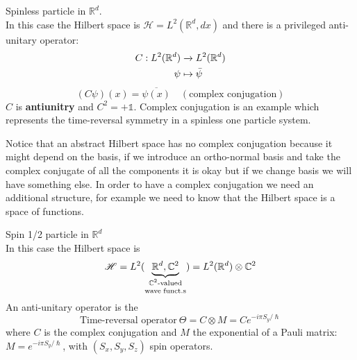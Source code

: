 \documentclass[../main.tex]{subfiles}
\begin{document}
\begin{example}
Spinless particle in $\mathbb{R}^d$.\\
In this case the Hilbert space is $\mathcal{H}=L^2(\mathbb{R}^d,dx)$ and there is a privileged anti-unitary operator: 
\[
\begin{split}
C:L^2(\mathbb{R}^d)&\xrightarrow[]{}L^2(\mathbb{R}^d)\\
\psi &\mapsto \Bar{\psi}
\end{split}
\]
\[
(C\psi)(x)=\overline{\psi(x)} \quad (\textrm{complex conjugation})
\]
$C$ is \textbf{antiunitry} and $C^2=+\mathbb{1}$. Complex conjugation is an example which represents the time-reversal symmetry in a spinless one particle system.
\end{example}
Notice that an abstract Hilbert space has no complex conjugation because it might depend on the basis, if we introduce an ortho-normal basis and take the complex conjugate of all the components it is okay but if we change basis we will have something else. In order to have a complex conjugation we need an additional structure, for example we need to know that the Hilbert space is a space of functions.
\begin{example}
Spin 1/2 particle in $\mathbb{R}^d$\\
In this case the Hilbert space is \[\mathcal{H}=L^2(\underbrace{\mathbb{R}^d,\mathbb{C}^2}_\text{\parbox{1.5cm}{\centering$\mathbb{C}^2$-valued\\[-4pt]  wave funct.s}})=L^2(\mathbb{R}^d)\otimes \mathbb{C}^2\]
An anti-unitary operator is the
\[
\mbox{Time-reversal operator}\ \Theta=C \otimes M=Ce^{-i\pi S_y/\hslash}
\]
where $C$ is the complex conjugation and $M$ the exponential of a Pauli matrix: $M=e^{-i\pi S_y/\hslash}$, with $(S_x,S_y,S_z)$ spin operators.
\end{example}
\end{document}
